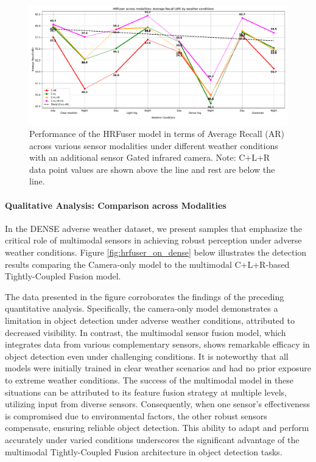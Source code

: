 \documentclass[report.tex]{subfiles}
\begin{document}
    \begin{figure}[]
        \centering
        \includegraphics[width=1.0\textwidth]{images/results/hrfuser/additional_modality/ar_2.pdf}
        \caption{Performance of the HRFuser model in terms of Average Recall (AR) across various sensor modalities under different weather conditions with an additional sensor Gated infrared camera. Note: C+L+R data point values are shown above the line and rest are below the line.}
        \label{fig:hrfuser_ar_2}
    \end{figure}

    \paragraph*{Qualitative Analysis: Comparison across Modalities}

    In the DENSE adverse weather dataset, we present samples that emphasize the critical role of multimodal sensors in achieving robust perception under adverse weather conditions. Figure \ref{fig:hrfuser_on_dense} below illustrates the detection results comparing the Camera-only model to the multimodal C+L+R-based Tightly-Coupled Fusion model.

    The data presented in the figure corroborates the findings of the preceding quantitative analysis. Specifically, the camera-only model demonstrates a limitation in object detection under adverse weather conditions, attributed to decreased visibility. In contrast, the multimodal sensor fusion model, which integrates data from various complementary sensors, shows remarkable efficacy in object detection even under challenging conditions. It is noteworthy that all models were initially trained in clear weather scenarios and had no prior exposure to extreme weather conditions. The success of the multimodal model in these situations can be attributed to its feature fusion strategy at multiple levels, utilizing input from diverse sensors. Consequently, when one sensor's effectiveness is compromised due to environmental factors, the other robust sensors compensate, ensuring reliable object detection. This ability to adapt and perform accurately under varied conditions underscores the significant advantage of the multimodal Tightly-Coupled Fusion architecture in object detection tasks.
\end{document}
